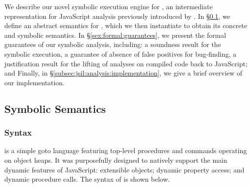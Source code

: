

We describe our novel symbolic execution engine for \jsil, an intermediate
representation for JavaScript analysis previously introduced by \citet{javert}. 
In \S\ref{subsec:jsil:analysis:formalism}, we define an abstract semantics for 
\jsil, which we then instantiate to obtain its concrete and symbolic semantics.
In \S\ref{sex:formal:guarantees}, we present the formal guarantees of 
our symbolic analysis, including:  a soundness result for the \jsil symbolic 
execution,  a guarantee of absence of false positives for bug-finding, 
 a justification result for the lifting of analyses on compiled \jsil code back to JavaScript;
and  
Finally, in \S\ref{subsec:jsil:analysis:implementation}, we give a brief overview
of our implementation. %


\subsection{Symbolic Semantics}\label{subsec:jsil:analysis:formalism}

\subsubsection{Syntax} 
\jsil is a simple goto language featuring top-level procedures and commands operating on object heaps. It was purposefully designed to natively support the main dynamic features of JavaScript: extensible objects; dynamic property access; and dynamic procedure calls. The syntax of \jsil is shown below. 

